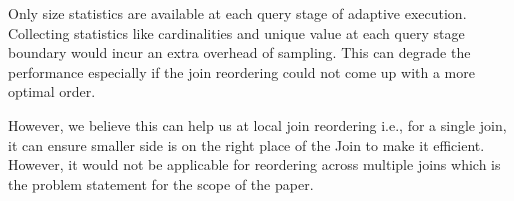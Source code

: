 Only size statistics are available at each query stage of adaptive execution. Collecting statistics like cardinalities and unique value at each query stage boundary would incur an extra overhead of sampling. This can degrade the performance especially if the join reordering could not come up with a more optimal order.

However, we believe this can help us at local join reordering i.e., for a single join, it can ensure smaller side is on the right place of the Join to make it efficient. However, it would not be applicable for reordering across multiple joins which is the problem statement for the scope of the paper. 